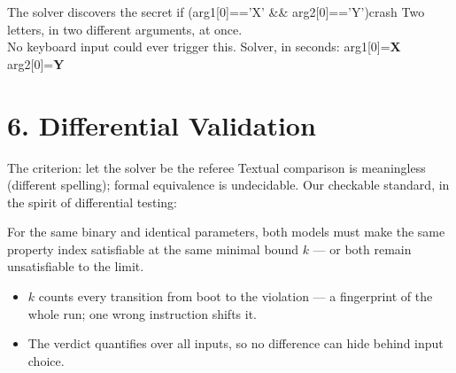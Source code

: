 \documentclass[aspectratio=169]{beamer}
\newcommand{\lab}[1]{{\footnotesize\color{ink!65}#1}}
\begin{document}
\begin{frame}{The solver discovers the secret}
  \centering\vfill
  \colorbox{ink}{\color{paper}\large\ttfamily\;if (arg1[0]=='X' \&\& arg2[0]=='Y')\;\textcolor{warm}{crash}\;}
  \vfill
  {\large Two letters, in \alert{two different} arguments, at once.}\\[4pt]
  \lab{No keyboard input could ever trigger this.}
  \vfill
  {\large Solver, in seconds:\quad
   {\ttfamily arg1[0]=\textcolor{accent}{\textbf{X}}}\quad
   {\ttfamily arg2[0]=\textcolor{accent}{\textbf{Y}}}}
  \vfill
\end{frame}

\section{6. Differential Validation}

\begin{frame}{The criterion: let the solver be the referee}
  Textual comparison is meaningless (different spelling); formal equivalence
  is undecidable. Our checkable standard, in the spirit of differential
  testing:
  \vspace{0.3em}
  \begin{block}{}
    For the same binary and identical parameters, both models must make the
    \alert{same property index} satisfiable at the \alert{same minimal bound
    $k$} --- or both remain unsatisfiable to the limit.
  \end{block}
  \vspace{0.3em}
  \begin{itemize}\setlength\itemsep{0.2em}\footnotesize
    \item $k$ counts every transition from boot to the violation --- a
          fingerprint of the whole run; one wrong instruction shifts it.
    \item The verdict quantifies over all inputs, so no difference can hide
          behind input choice.
  \end{itemize}
\end{frame}
\end{document}
